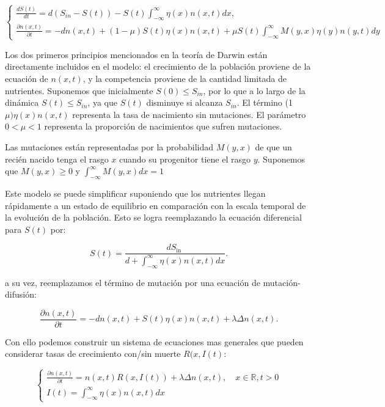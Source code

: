 \begin{equation*}
	\left\{\begin{array}{l}
		\frac{d S(t)}{d t}=d\left(S_{i n}-S(t)\right)-S(t) \int_{-\infty}^{\infty} \eta(x) n(x, t) d x, \\
		\frac{\partial n(x, t)}{\partial t}=-d n(x, t)+(1-\mu) S(t) \eta(x) n(x, t)+\mu S(t) \int_{-\infty}^{\infty} M(y, x) \eta(y) n(y, t) d y
	\end{array}\right.
\end{equation*}

Los dos primeros principios mencionados en la teoría de Darwin están directamente incluidos en el modelo: el crecimiento de la población proviene de la ecuación de $n(x, t)$, y la competencia proviene de la cantidad limitada de nutrientes. Suponemos que inicialmente $S(0) \leq S_{i n}$, por lo que a lo largo de la dinámica $S(t) \leq S_{i n}$, ya que $S(t)$ disminuye si alcanza $S_{i n}$. El término (1$\mu) \eta(x) n(x, t)$ representa la tasa de nacimiento sin mutaciones. El parámetro $0<\mu<1$ representa la proporción de nacimientos que sufren mutaciones.

Las mutaciones están representadas por la probabilidad $M(y, x)$ de que un recién nacido tenga el rasgo $x$ cuando su progenitor tiene el rasgo $y$. Suponemos que $M(y, x) \geq 0$ y $\int_{-\infty}^{\infty} M(y, x) d x=1$

Este modelo se puede simplificar suponiendo que los nutrientes llegan rápidamente a un estado de equilibrio en comparación con la escala temporal de la evolución de la población. Esto se logra reemplazando la ecuación diferencial para $S(t)$ por:

\begin{equation*}
	S(t)=\frac{d S_{\text {in }}}{d+\int_{-\infty}^{\infty} \eta(x) n(x, t) d x} .
\end{equation*}

a su vez, reemplazamos el término de mutación por una ecuación de mutación-difusión:

\begin{equation*}
	\frac{\partial n(x, t)}{\partial t}=-d n(x, t)+S(t) \eta(x) n(x, t)+\lambda \Delta n(x, t) .
\end{equation*}

Con ello podemos construir un sistema de ecuaciones mas generales que pueden considerar tasas de crecimiento con/sin muerte $R(x,I(t)$:

\begin{equation*}
	\left\{\begin{array}{l}
		\frac{\partial n(x, t)}{\partial t}=n(x, t) R(x, I(t))+\lambda \Delta n(x, t), \quad x \in \mathbb{R}, t>0 \\
		I(t)=\int_{-\infty}^{\infty} \eta(x) n(x, t) d x
	\end{array}\right.
\end{equation*}

